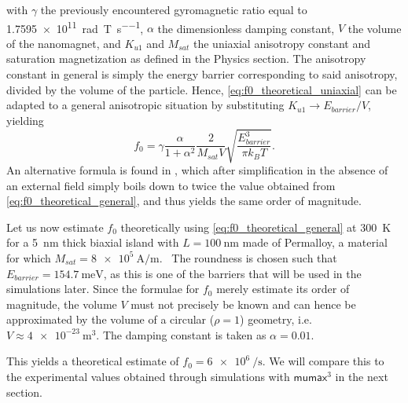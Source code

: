 \documentclass[11pt,a4paper,english]{article}
\newcommand{\mumax}{$\mathsf{mumax}^3$}
\begin{document}
with $\gamma$ the previously encountered gyromagnetic ratio equal to \SI{1.7595e11}{\radian\per\tesla\per\second}, $\alpha$ the dimensionless damping constant, $V$ the volume of the nanomagnet, and $K_{u1}$ and $M_{sat}$ the uniaxial anisotropy constant and saturation magnetization as defined in the Physics section. The anisotropy constant in general is simply the energy barrier corresponding to said anisotropy, divided by the volume of the particle. Hence, \cref{eq:f0_theoretical_uniaxial} can be adapted to a general anisotropic situation by substituting $K_{u1} \rightarrow E_{barrier}/V$, yielding
\begin{equation}
    f_0 = \gamma \frac{\alpha}{1+\alpha^2} \frac{2}{M_{sat} V} \sqrt{\frac{E_{barrier}^3}{\pi k_B T}} \mathrm{.}
    \label{eq:f0_theoretical_general}
\end{equation}
An alternative formula is found in \cite{f0_alternative_Jonathan}, which after simplification in the absence of an external field simply boils down to twice the value obtained from \cref{eq:f0_theoretical_general}, and thus yields the same order of magnitude. \par
Let us now estimate $f_0$ theoretically using \cref{eq:f0_theoretical_general} at \SI{300}{\kelvin} for a \SI{5}{\nano\metre} thick biaxial island with $L=\SI{100}{\nano\metre}$ made of Permalloy, a material for which $M_{sat}=\SI{8e5}{\ampere\per\metre}$.~\cite{MuMax3} The roundness is chosen such that $E_{barrier}=\SI{154.7}{\milli\electronvolt}$, as this is one of the barriers that will be used in the simulations later. Since the formulae for $f_0$ merely estimate its order of magnitude, the volume $V$ must not precisely be known and can hence be approximated by the volume of a circular ($\rho=1$) geometry, i.e. $V\approx\SI{4e-23}{\metre\cubed}$. The damping constant is taken as $\alpha=0.01$. \par
This yields a theoretical estimate of $f_0 = \SI{6e6}{\per\second}$. We will compare this to the experimental values obtained through simulations with \mumax{} in the next section.
\end{document}
